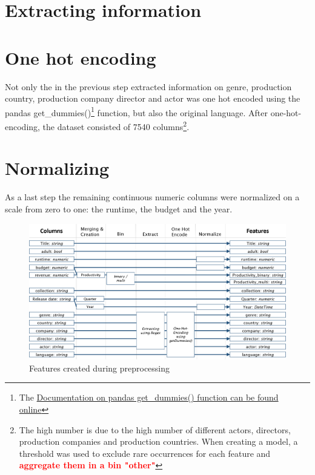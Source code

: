 \section{Extracting information}


\section{One hot encoding}
Not only the in the previous step extracted information on genre, production country, production company director and actor was one hot encoded using the pandas get\_dummies()\footnote{The \hyperref{https://pandas.pydata.org/pandas-docs/stable/generated/pandas.get_dummies.html}{documentation}{pd.getDumies}{Documentation on pandas get\_dummies() function can be found online}} function, but also the original language. After one-hot-encoding, the dataset consisted of 7540 columns\footnote{The high number is due to the high number of different actors, directors, production companies and production countries. When creating a model, a threshold was used to exclude rare occurrences for each feature and {\textcolor{red}{\textbf{aggregate them in a bin "other"}}}}.

\section{Normalizing}
As a last step the remaining continuous numeric columns were normalized on a scale from zero to one: the runtime, the budget and the year.

\begin{figure}
\includegraphics[width=\textwidth]{images/3_features.png}
\caption{Features created during preprocessing}
\label{img:features}
\end{figure}



